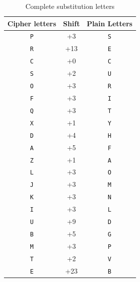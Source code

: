                 \begin{table}[h]
                    \centering
                    \begin{tabular}{|c|c|c|}
                        \toprule
                        Cipher letters & Shift & Plain Letters \\
                        \midrule
                        \texttt{P} & +3 & \texttt{S} \\
                        \texttt{R} & +13 & \texttt{E} \\
                        \texttt{C} & +0 & \texttt{C} \\
                        \texttt{S} & +2 & \texttt{U} \\
                        \texttt{O} & +3 & \texttt{R} \\
                        \texttt{F} & +3 & \texttt{I} \\
                        \texttt{Q} & +3 & \texttt{T} \\
                        \texttt{X} & +1 & \texttt{Y} \\
                        \texttt{D} & +4 & \texttt{H} \\
                        \texttt{A} & +5 & \texttt{F} \\
                        \texttt{Z} & +1 & \texttt{A} \\
                        \texttt{L} & +3 & \texttt{O} \\
                        \texttt{J} & +3 & \texttt{M} \\
                        \texttt{K} & +3 & \texttt{N} \\
                        \texttt{I} & +3 & \texttt{L} \\
                        \texttt{U} & +9 & \texttt{D} \\
                        \texttt{B} & +5 & \texttt{G} \\
                        \texttt{M} & +3 & \texttt{P} \\
                        \texttt{T} & +2 & \texttt{V} \\
                        \texttt{E} & +23 & \texttt{B} \\
                        \bottomrule
                    \end{tabular}
                    \caption{Complete substitution letters}
                    \label{tab:sub_table}
                \end{table}

